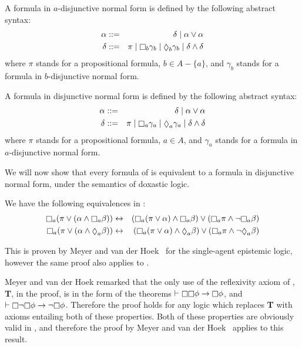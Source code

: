 \begin{definition}
A formula in $a$-disjunctive normal form is defined by the following abstract syntax:
\begin{eqnarray*}
\alpha &::=& \delta \bnfalt \alpha \lor \alpha\\
\delta &::=& \pi \bnfalt \knows_b \gamma_b \bnfalt \suspects_b \gamma_b \bnfalt
\delta \land \delta
\end{eqnarray*}
where $\pi$ stands for a propositional formula, $b \in A - \{a\}$, and
$\gamma_b$ stands for a formula in $b$-disjunctive normal form.

A formula in disjunctive normal form is defined by the following abstract syntax:
\begin{eqnarray*}
\alpha &::=& \delta \bnfalt \alpha \lor \alpha\\
\delta &::=& \pi \bnfalt \knows_a \gamma_a \bnfalt \suspects_a \gamma_a \bnfalt
\delta \land \delta
\end{eqnarray*}
where $\pi$ stands for a propositional formula, $a \in A$, and $\gamma_a$
stands for a formula in $a$-disjunctive normal form.
\end{definition}

We will now show that every formula of \lang{} is equivalent to a formula in
disjunctive normal form, under the semantics of doxastic logic.

\begin{lemma}\label{kd45-dnf-equivalences}
We have the following equivalences in \logicKD{}:
\begin{eqnarray*}
\knows_a (\pi \lor (\alpha \land \knows_a \beta)) &\iff& (\knows_a (\pi \lor \alpha)
\land \knows_a \beta) \lor (\knows_a \pi \land \neg \knows_a \beta)\\
\knows_a (\pi \lor (\alpha \land \suspects_a \beta)) &\iff& (\knows_a (\pi \lor \alpha)
\land \suspects_a \beta) \lor (\knows_a \pi \land \neg \suspects_a \beta)
\end{eqnarray*}
\end{lemma}

This is proven by Meyer and van der Hoek~\cite{meyer2004epistemic} for the
single-agent epistemic logic, however the same proof also applies to \logicKD{}.

Meyer and van der Hoek remarked that the only use of the reflexivity axiom of
\logicS{}, {\bf T}, in the proof, is in the form of the theorems $\proves \knows
\knows \phi \implies \knows \phi$, and $\proves \knows \neg \knows \phi \implies
\neg \knows \phi$. Therefore the proof holds for any logic which replaces {\bf
T} with axioms entailing both of these properties. Both of these properties are
obviously valid in \logicKD{}, and therefore the proof by Meyer and van der
Hoek~\cite{meyer2004epistemic} applies to this result.


